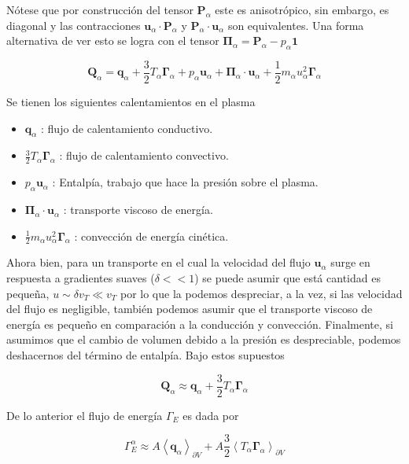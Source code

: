   N\'otese que por construcci\'on del tensor $\textbf{P}_\alpha$ este es anisotr\'opico, sin embargo, es diagonal y las contracciones $\textbf{u}_\alpha\cdot\textbf{P}_\alpha$ y $\textbf{P}_\alpha\cdot\textbf{u}_\alpha$ son equivalentes. Una forma alternativa de ver esto se logra con el tensor $\pmb{\Pi}_\alpha = \textbf{P}_\alpha - p_\alpha\pmb{1}$ 

  \begin{equation}
    \textbf{Q}_\alpha = \textbf{q}_\alpha + \frac{3}{2}T_\alpha\pmb{\Gamma}_\alpha + p_\alpha\textbf{u}_\alpha + \pmb{\Pi}_\alpha\cdot\textbf{u}_\alpha + \frac{1}{2}m_\alpha u_\alpha^2\pmb{\Gamma}_\alpha
  \end{equation}

  Se tienen los siguientes calentamientos en el plasma\cite{helander2005}

  \begin{itemize}
    \item $\textbf{q}_\alpha$ : flujo de calentamiento conductivo.
    \item $\frac{3}{2}T_\alpha\pmb{\Gamma}_\alpha$ : flujo de calentamiento convectivo.
    \item $p_\alpha\textbf{u}_\alpha$ : Entalp\'ia, trabajo que hace la presi\'on sobre el plasma.
    \item $\pmb{\Pi}_\alpha\cdot\textbf{u}_\alpha$ : transporte viscoso de energ\'ia.
    \item $\frac{1}{2}m_\alpha u_\alpha^2\pmb{\Gamma}_\alpha$ : convecci\'on de energ\'ia cin\'etica.
  \end{itemize}

Ahora bien, para un transporte en el cual la velocidad del flujo $\textbf{u}_\alpha$ surge en respuesta a gradientes suaves ($\delta << 1$) se puede asumir que est\'a cantidad es pequeña, $u \sim \delta v_T \ll v_T$ por lo que la podemos despreciar, a la vez, si las velocidad del flujo es negligible, tambi\'en podemos asumir que el transporte viscoso de energ\'ia es pequeño en comparaci\'on a la conducci\'on y convecci\'on. Finalmente, si asumimos que el cambio de volumen debido a la presi\'on es despreciable, podemos deshacernos del t\'ermino de entalp\'ia. Bajo estos supuestos\cite{dinklage2005}

  \begin{equation}
    \textbf{Q}_\alpha \approx \textbf{q}_\alpha + \frac{3}{2}T_\alpha\pmb{\Gamma}_\alpha \label{eq:Qaprox}
  \end{equation}

  De lo anterior el flujo de energ\'ia $\Gamma_E$ es dada por 

  \begin{equation}\label{eq:heatfluxp}
  \Gamma_E^\alpha \approx A\left<\textbf{q}_\alpha\right>_{\partial V} + A\frac{3}{2}\left<T_\alpha\pmb{\Gamma}_\alpha\right>_{\partial V}
  \end{equation}
